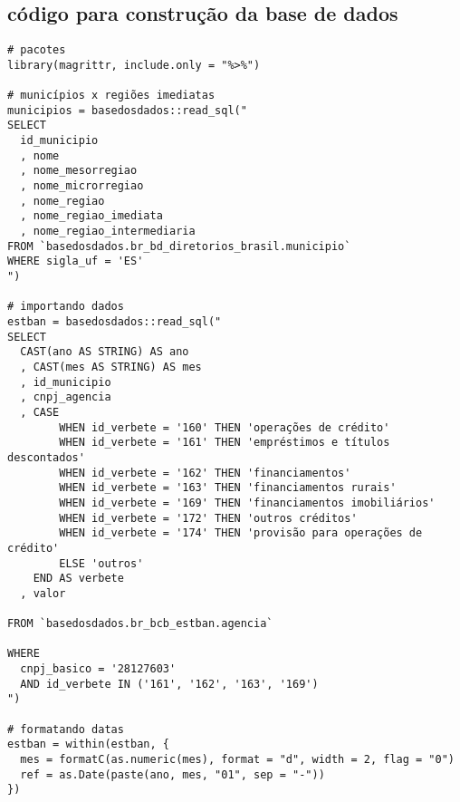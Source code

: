 \postextual

%
%
%
%
%

\begin{anexosenv}
\partanexos

\chapter{código para construção da base de dados}\label{anexo_a}

\begin{lstlisting}[frame=single]
# pacotes
library(magrittr, include.only = "%>%")

# municípios x regiões imediatas
municipios = basedosdados::read_sql("
SELECT
  id_municipio
  , nome
  , nome_mesorregiao
  , nome_microrregiao
  , nome_regiao
  , nome_regiao_imediata
  , nome_regiao_intermediaria
FROM `basedosdados.br_bd_diretorios_brasil.municipio`
WHERE sigla_uf = 'ES'
")

# importando dados
estban = basedosdados::read_sql("
SELECT
  CAST(ano AS STRING) AS ano
  , CAST(mes AS STRING) AS mes
  , id_municipio
  , cnpj_agencia
  , CASE
        WHEN id_verbete = '160' THEN 'operações de crédito'
        WHEN id_verbete = '161' THEN 'empréstimos e títulos descontados'
        WHEN id_verbete = '162' THEN 'financiamentos'
        WHEN id_verbete = '163' THEN 'financiamentos rurais'
        WHEN id_verbete = '169' THEN 'financiamentos imobiliários'
        WHEN id_verbete = '172' THEN 'outros créditos'
        WHEN id_verbete = '174' THEN 'provisão para operações de crédito'
        ELSE 'outros'
    END AS verbete
  , valor

FROM `basedosdados.br_bcb_estban.agencia`

WHERE
  cnpj_basico = '28127603'
  AND id_verbete IN ('161', '162', '163', '169')
")

# formatando datas
estban = within(estban, {
  mes = formatC(as.numeric(mes), format = "d", width = 2, flag = "0")
  ref = as.Date(paste(ano, mes, "01", sep = "-"))
})


\end{lstlisting}
\end{anexosenv}
